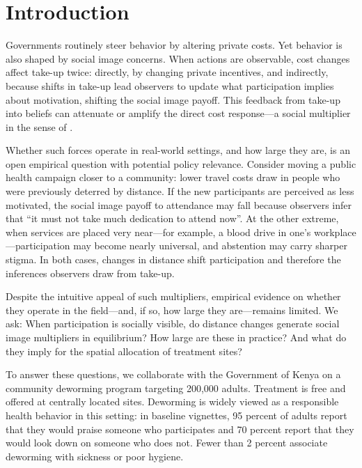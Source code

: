 \documentclass[12pt,a4paper]{article}
\begin{document}
\section{Introduction}
\label{intro}



Governments routinely steer behavior by altering private costs. Yet behavior is also shaped by social image concerns. When actions are observable, cost changes affect take-up twice: directly, by changing private incentives, and indirectly, because shifts in take-up lead observers to update what participation implies about motivation, shifting the social image payoff. This feedback from take-up into beliefs can attenuate or amplify the direct cost response—a social multiplier in the sense of \citet{Benabou_laws_2011}.

Whether such forces operate in real-world settings, and how large they are, is an open empirical question with potential policy relevance. Consider moving a public health campaign closer to a community: lower travel costs draw in people who were previously deterred by distance. If the new participants are perceived as less motivated, the social image payoff to attendance may fall because observers infer that “it must not take much dedication to attend now”. At the other extreme, when services are placed very near—for example, a blood drive in one’s workplace—participation may become nearly universal, and abstention may carry sharper stigma. In both cases, changes in distance shift participation and therefore the inferences observers draw from take-up.%

Despite the intuitive appeal of such multipliers, empirical evidence on whether they operate in the field—and, if so, how large they are—remains limited. We ask: When participation is socially visible, do distance changes generate social image multipliers in equilibrium? How large are these in practice? And what do they imply for the spatial allocation of treatment sites?

To answer these questions, we collaborate with the Government of Kenya on a community deworming program targeting 200{,}000 adults. Treatment is free and offered at centrally located sites. Deworming is widely viewed as a responsible health behavior in this setting: in baseline vignettes, 95 percent of adults report that they would praise someone who participates and 70 percent report that they would look down on someone who does not. Fewer than 2 percent associate deworming with sickness or poor hygiene.
\end{document}
